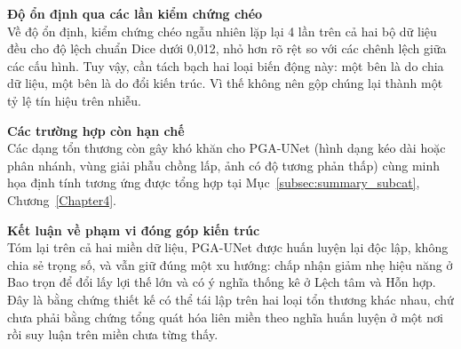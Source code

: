 \noindent\textbf{Độ ổn định qua các lần kiểm chứng chéo}\\
Về độ ổn định, kiểm chứng chéo ngẫu nhiên lặp lại 4 lần trên cả hai bộ dữ liệu đều cho độ lệch chuẩn Dice dưới 0,012, nhỏ hơn rõ rệt so với các chênh lệch giữa các cấu hình. Tuy vậy, cần tách bạch hai loại biến động này: một bên là do chia dữ liệu, một bên là do đổi kiến trúc. Vì thế không nên gộp chúng lại thành một tỷ lệ tín hiệu trên nhiễu.

\noindent\textbf{Các trường hợp còn hạn chế}\\
Các dạng tổn thương còn gây khó khăn cho PGA-UNet (hình dạng kéo dài hoặc phân nhánh, vùng giải phẫu chồng lấp, ảnh có độ tương phản thấp) cùng minh họa định tính tương ứng được tổng hợp tại Mục~\ref{subsec:summary_subcat}, Chương~\ref{Chapter4}.

\noindent\textbf{Kết luận về phạm vi đóng góp kiến trúc}\\
Tóm lại trên cả hai miền dữ liệu, PGA-UNet được huấn luyện lại độc lập, không chia sẻ trọng số, và vẫn giữ đúng một xu hướng: chấp nhận giảm nhẹ hiệu năng ở Bao trọn để đổi lấy lợi thế lớn và có ý nghĩa thống kê ở Lệch tâm và Hỗn hợp. Đây là bằng chứng thiết kế có thể tái lập trên hai loại tổn thương khác nhau, chứ chưa phải bằng chứng tổng quát hóa liên miền theo nghĩa huấn luyện ở một nơi rồi suy luận trên miền chưa từng thấy.
